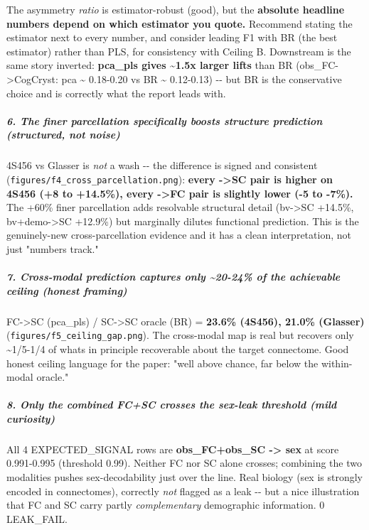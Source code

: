 The asymmetry \emph{ratio} is estimator-robust (good), but the \textbf{absolute headline numbers depend on which estimator you quote.} Recommend stating the estimator next to every number, and consider leading F1 with BR (the best estimator) rather than PLS, for consistency with Ceiling B. Downstream is the same story inverted: \textbf{pca\_pls gives \textasciitilde1.5x larger lifts} than BR (obs\_FC-\textgreater CogCryst: pca \textasciitilde{} 0.18-0.20 vs BR \textasciitilde{} 0.12-0.13) -\/- but BR is the conservative choice and is correctly what the report leads with.

\subparagraph{6. The finer parcellation specifically boosts structure prediction (structured, not noise)}\label{6-the-finer-parcellation-specifically-boosts-structure-prediction-structured-not-noise}

4S456 vs Glasser is \emph{not} a wash -\/- the difference is signed and consistent (\texttt{figures/f4\_cross\_parcellation.png}): \textbf{every -\textgreater SC pair is higher on 4S456 (+8 to +14.5\%), every -\textgreater FC pair is slightly lower (-5 to -7\%).} The +60\% finer parcellation adds resolvable structural detail (bv-\textgreater SC +14.5\%, bv+demo-\textgreater SC +12.9\%) but marginally dilutes functional prediction. This is the genuinely-new cross-parcellation evidence and it has a clean interpretation, not just "numbers track."

\subparagraph{7. Cross-modal prediction captures only \textasciitilde20-24\% of the achievable ceiling (honest framing)}\label{7-cross-modal-prediction-captures-only-20-24-of-the-achievable-ceiling-honest-framing}

FC-\textgreater SC (pca\_pls) / SC-\textgreater SC oracle (BR) = \textbf{23.6\% (4S456), 21.0\% (Glasser)} (\texttt{figures/f5\_ceiling\_gap.png}). The cross-modal map is real but recovers only \textasciitilde1/5-1/4 of what\textquotesingle s in principle recoverable about the target connectome. Good honest ceiling language for the paper: "well above chance, far below the within-modal oracle."

\subparagraph{\texorpdfstring{8. Only the \emph{combined} FC+SC crosses the sex-leak threshold (mild curiosity)}{8. Only the combined FC+SC crosses the sex-leak threshold (mild curiosity)}}\label{8-only-the-combined-fcsc-crosses-the-sex-leak-threshold-mild-curiosity}

All 4 EXPECTED\_SIGNAL rows are \textbf{obs\_FC+obs\_SC -\textgreater{} sex} at score 0.991-0.995 (threshold 0.99). Neither FC nor SC alone crosses; combining the two modalities pushes sex-decodability just over the line. Real biology (sex is strongly encoded in connectomes), correctly \emph{not} flagged as a leak -\/- but a nice illustration that FC and SC carry partly \emph{complementary} demographic information. 0 LEAK\_FAIL.

